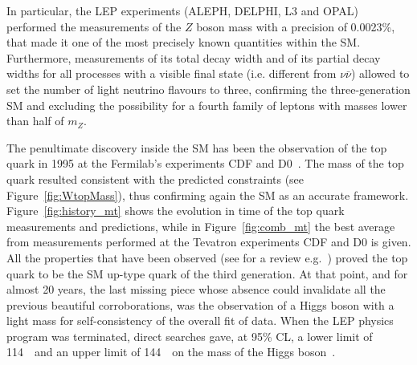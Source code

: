 In particular, the LEP experiments (ALEPH, DELPHI, L3 and OPAL) performed the measurements 
of the $Z$ boson mass with a precision of 0.0023\%, that made it one of the most 
precisely known quantities within the SM. %
Furthermore, measurements of its total 
decay width and of its partial decay widths for all processes with a 
visible final state (i.e. different from $\nu\bar\nu$) allowed to set 
the number of light neutrino flavours to three, confirming the three-generation 
SM and excluding the possibility for a fourth family of leptons with masses
 lower than half of $m_Z$.

The penultimate discovery inside the SM has been the observation of the 
top quark in 1995 at the Fermilab's experiments CDF and 
D0~\cite{PhysRevLett.74.2626,PhysRevLett.74.2422}. 
The mass of the top quark resulted consistent with the predicted 
constraints (see Figure~\ref{fig:WtopMass}), 
thus confirming again the SM as an accurate framework. 
Figure~\ref{fig:history_mt} shows the evolution in
time of the top quark measurements and predictions,
while in Figure~\ref{fig:comb_mt} the best average
from measurements performed at the Tevatron experiments
CDF and D0 is given. All the properties that have been
observed (see for a review e.g.~\cite{Wicke:2010cg})
proved the top quark to be the SM up-type quark of the third generation.
At that point, and for almost 20 years, the last missing piece whose
absence could invalidate all the previous beautiful corroborations, was
the observation of a Higgs boson with a light mass for  self-consistency 
of the overall fit of data. When the LEP physics program was terminated,
direct searches gave, at 95\% CL, a lower limit of 114~\gev\ and an upper 
limit of 144~\gev\ on the mass of the Higgs boson~\cite{Renton}.

